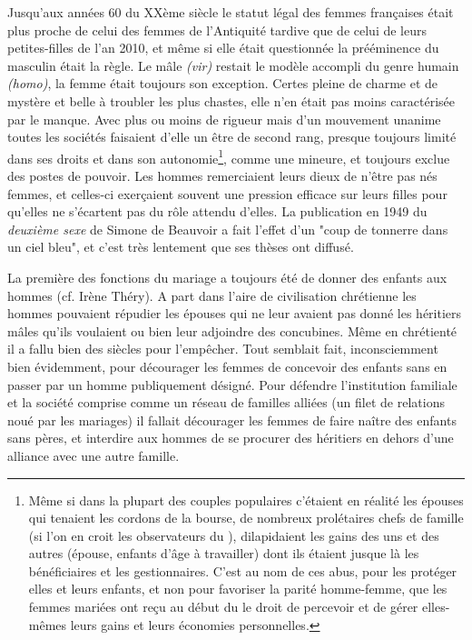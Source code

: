 Jusqu'aux années 60 du XXème siècle le statut légal des femmes françaises était plus proche de celui des femmes de l'Antiquité tardive que de celui de leurs petites-filles de l'an 2010, et même si elle était questionnée la prééminence du masculin était la règle. Le mâle \emph{(vir)} restait le modèle accompli du genre humain \emph{(homo)}, la femme était toujours son exception. Certes pleine de charme et de mystère et belle à troubler les plus chastes, elle n'en était pas moins caractérisée par le manque. Avec plus ou moins de rigueur mais d'un mouvement unanime toutes les sociétés faisaient d'elle un être de second rang, presque toujours limité dans ses droits et dans son autonomie\footnote{Même si dans la plupart des couples populaires c'étaient en réalité les épouses qui tenaient les cordons de la bourse,  de nombreux prolétaires chefs de famille (si l'on en croit les observateurs du ), dilapidaient les gains des uns et des autres (épouse, enfants d'âge à travailler) dont ils étaient jusque là les bénéficiaires et les gestionnaires. C'est au nom de ces abus, pour les protéger elles et leurs enfants, et non pour favoriser la parité homme-femme, que les femmes mariées ont reçu au début du  le droit de percevoir et de gérer elles-mêmes leurs gains et leurs économies personnelles.}, comme une mineure, et toujours exclue des postes de pouvoir. Les hommes remerciaient leurs dieux de n'être pas nés femmes, et celles-ci exerçaient souvent une pression efficace sur leurs filles pour qu'elles ne s'écartent pas du rôle attendu d'elles. La publication en 1949 du \emph{deuxième sexe} de Simone de Beauvoir a fait l'effet d'un "coup de tonnerre dans un ciel bleu", et c'est très lentement que ses thèses ont diffusé.
 
 
 
La première des fonctions du mariage a toujours été de donner des enfants aux hommes (cf. Irène Théry). A part dans l'aire de civilisation chrétienne les hommes pouvaient répudier les épouses qui ne leur avaient pas donné les héritiers mâles qu'ils voulaient ou bien leur adjoindre des concubines. Même en chrétienté il a fallu bien des siècles pour l'empêcher. Tout semblait fait, inconsciemment bien évidemment, pour décourager les femmes de concevoir des enfants sans en passer par un homme publiquement désigné. Pour défendre l'institution familiale et la société comprise comme un réseau de familles alliées (un filet de relations noué par les mariages) il fallait décourager les femmes de faire naître des enfants sans pères, et interdire aux hommes de se procurer des héritiers en dehors d'une alliance avec une autre famille. 

